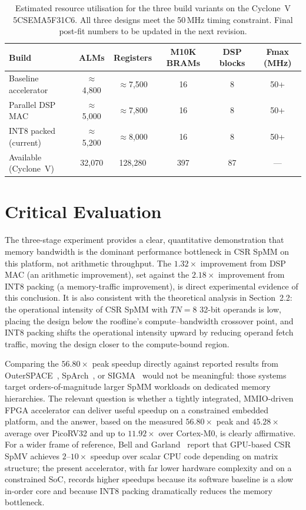 \begin{table}[htbp]
  \centering
  \small
  \begin{tabular}{lccccc}
  \toprule
  Build & ALMs & Registers & M10K BRAMs & DSP blocks & Fmax (MHz) \\
  \midrule
  Baseline accelerator  & $\approx$4,800 & $\approx$7,500 & 16 & 8 & 50+ \\
  Parallel DSP MAC      & $\approx$5,000 & $\approx$7,800 & 16 & 8 & 50+ \\
  INT8 packed (current) & $\approx$5,200 & $\approx$8,000 & 16 & 8 & 50+ \\
  \midrule
  Available (Cyclone~V) & 32,070 & 128,280 & 397 & 87 & --- \\
  \bottomrule
  \end{tabular}
  \caption{Estimated resource utilisation for the three build variants on
           the Cyclone~V 5CSEMA5F31C6. All three designs meet the 50\,MHz
           timing constraint. Final post-fit numbers to be updated in the
           next revision.}
  \label{tab:quartus-final}
\end{table}

\section{Critical Evaluation}

The three-stage experiment provides a clear, quantitative demonstration
that memory bandwidth is the dominant performance bottleneck in CSR SpMM
on this platform, not arithmetic throughput. The $1.32\times$ improvement
from DSP MAC (an arithmetic improvement), set against the $2.18\times$
improvement from INT8 packing (a memory-traffic improvement), is direct
experimental evidence of this conclusion. It is also consistent with the
theoretical analysis in Section~2.2: the operational intensity of CSR
SpMM with $TN = 8$ 32-bit operands is low, placing the design below the
roofline's compute--bandwidth crossover point, and INT8 packing shifts
the operational intensity upward by reducing operand fetch traffic,
moving the design closer to the compute-bound region.

Comparing the $56.80\times$ peak speedup directly against reported
results from OuterSPACE~\citep{outerspace2018}, SpArch~\citep{sparch2020},
or SIGMA~\citep{sigma2020} would not be meaningful: those systems target
orders-of-magnitude larger SpMM workloads on dedicated memory hierarchies.
The relevant question is whether a tightly integrated, MMIO-driven FPGA
accelerator can deliver useful speedup on a constrained embedded
platform, and the answer, based on the measured $56.80\times$ peak and
$45.28\times$ average over PicoRV32 and up to $11.92\times$ over
Cortex-M0, is clearly affirmative. For a wider frame of reference, Bell
and Garland~\citep{bell_garland2009} report that GPU-based CSR SpMV
achieves $2$--$10\times$ speedup over scalar CPU code depending on
matrix structure; the present accelerator, with far lower hardware
complexity and on a constrained SoC, records higher speedups because its
software baseline is a slow in-order core and because INT8 packing
dramatically reduces the memory bottleneck.

